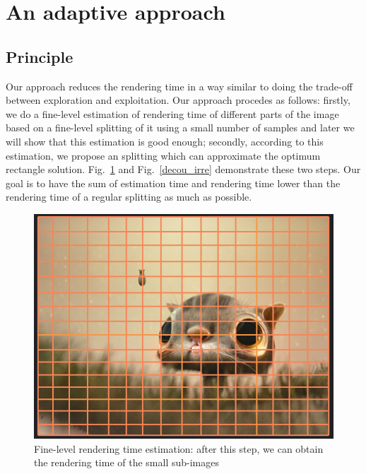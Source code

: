 \documentclass[10pt, conference, compsocconf]{IEEEtran}
\begin{document}
\section{An adaptive approach} \label{TwoPhases}

\subsection{Principle}

Our approach reduces the rendering time in a way similar to doing the trade-off between exploration and exploitation. Our approach procedes as follows: firstly, we do a fine-level estimation of rendering time of different parts of the image based on a fine-level splitting of it using a small number of samples and later we will show that this estimation is good enough; secondly, according to this estimation, we propose an splitting which can approximate the optimum rectangle solution. Fig.~\ref{grid} and Fig.~\ref{decou_irre} demonstrate these two steps. Our goal is to have the sum of estimation time and rendering time lower than the rendering time of a regular splitting as much as possible. 

\begin{figure}[htbp]
\centerline{\includegraphics{grid}}
\caption{Fine-level rendering time estimation: after this step, we can obtain the rendering time of the small sub-images}
\label{grid}
\end{figure}
\end{document}
